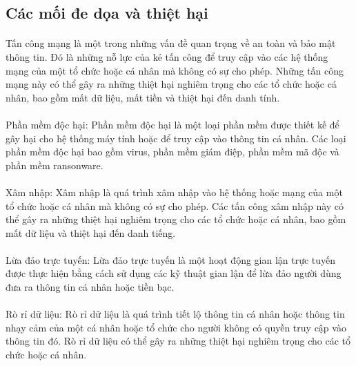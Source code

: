 \subsection{Các mối đe dọa và thiệt hại}


\paragraph{}
Tấn công mạng là một trong những vấn đề quan trọng về an toàn và bảo mật thông tin. Đó là những nỗ lực của kẻ tấn công để truy cập vào các hệ thống mạng của một tổ chức hoặc cá nhân mà không có sự cho phép. Những tấn công mạng này có thể gây ra những thiệt hại nghiêm trọng cho các tổ chức hoặc cá nhân, bao gồm mất dữ liệu, mất tiền và thiệt hại đến danh tính.

\paragraph{}
Phần mềm độc hại: Phần mềm độc hại là một loại phần mềm được thiết kế để gây hại cho hệ thống máy tính hoặc để truy cập vào thông tin cá nhân. Các loại phần mềm độc hại bao gồm virus, phần mềm giám điệp, phần mềm mã độc và phần mềm ransonware.

\paragraph{}
Xâm nhập: Xâm nhập là quá trình xâm nhập vào hệ thống hoặc mạng của một tổ chức hoặc cá nhân mà không có sự cho phép. Các tấn công xâm nhập này có thể gây ra những thiệt hại nghiêm trọng cho các tổ chức hoặc cá nhân, bao gồm mất dữ liệu và thiệt hại đến danh tiếng. 

\paragraph{}
Lừa đảo trực tuyến: Lừa đảo trực tuyến là một hoạt động gian lận trực tuyến được thực hiện bằng cách sử dụng các kỹ thuật gian lận để lừa đảo người dùng đưa ra thông tin cá nhân hoặc tiền bạc. 

\paragraph{}
Rò rỉ dữ liệu: Rò rỉ dữ liệu là quá trình tiết lộ thông tin cá nhân hoặc thông tin nhạy cảm của một cá nhân hoặc tổ chức cho người không có quyền truy cập vào thông tin đó. Rò rỉ dữ liệu có thể gây ra những thiệt hại nghiêm trọng cho các tổ chức hoặc cá nhân.


